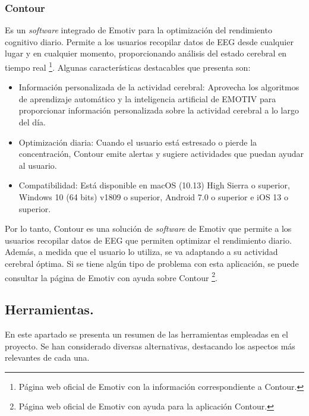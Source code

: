 \subsubsection{Contour}
Es un \textit{software} integrado de Emotiv para la optimización del rendimiento cognitivo diario. Permite a los usuarios recopilar datos de EEG desde cualquier lugar y en cualquier momento, proporcionando análisis del estado cerebral en tiempo real \cite{Contour}\footnote{Página web oficial de Emotiv con la información correspondiente a Contour\cite{Contour}.}. Algunas características destacables que presenta son:
\begin{itemize}
    \item Información personalizada de la actividad cerebral: Aprovecha los algoritmos de aprendizaje automático y la inteligencia artificial de EMOTIV para proporcionar información personalizada sobre la actividad cerebral a lo largo del día.
    \item Optimización diaria: Cuando el usuario está estresado o pierde la concentración, Contour emite alertas y sugiere actividades que puedan ayudar al usuario.
    \item Compatibilidad: Está disponible en macOS (10.13) High Sierra o superior, Windows 10 (64 bits) v1809 o superior, Android 7.0 o superior e iOS 13 o superior.
\end{itemize}

Por lo tanto, Contour es una solución de \textit{software} de Emotiv que permite a los usuarios recopilar datos de EEG que permiten optimizar el rendimiento diario. Además, a medida que el usuario lo utiliza, se va adaptando a su actividad cerebral óptima. Si se tiene algún tipo de problema con esta aplicación, se puede consultar la página de Emotiv con ayuda sobre Contour \cite{ContourHelp}\footnote{Página web oficial de Emotiv con ayuda para la aplicación Contour\cite{ContourHelp}.}.

\subsection{Herramientas.}

En este apartado se presenta un resumen de las herramientas empleadas en el proyecto. Se han considerado diversas alternativas, destacando los aspectos más relevantes de cada una.

